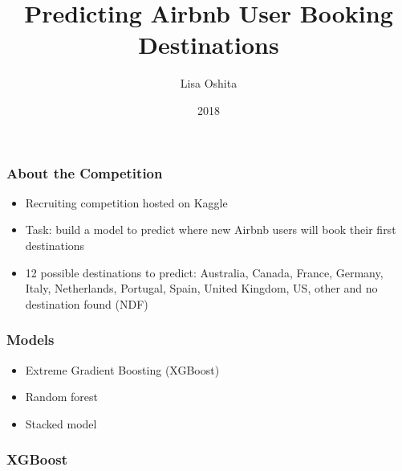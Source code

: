\documentclass{beamer}
\title{Predicting Airbnb User Booking Destinations}
\author{Lisa Oshita}
\institute{California Polytechnic State University, San Luis Obispo}
\date{2018}
\begin{document}
 
\frame{\titlepage}

\begin{frame}
\frametitle{About the Competition}
  \begin{itemize}
    \item Recruiting competition hosted on Kaggle
    \item Task: build a model to predict where new Airbnb users will book their first destinations
    \item 12 possible destinations to predict: Australia, Canada, France, Germany, Italy, Netherlands, Portugal, Spain, United Kingdom, US, other and no destination found (NDF)
  \end{itemize}
\end{frame}

\begin{frame}
\frametitle{Models}
  \begin{itemize}
    \item Extreme Gradient Boosting (XGBoost)
    \item Random forest
    \item Stacked model
  \end{itemize}
\end{frame}

\begin{frame}
\frametitle{XGBoost}
\end{frame}


\end{document}
